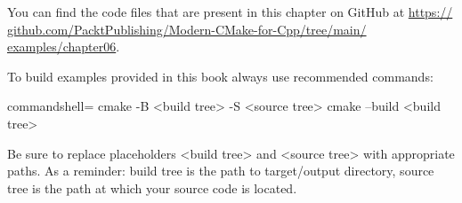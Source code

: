 You can find the code files that are present in this chapter on GitHub at \url{https:// github.com/PacktPublishing/Modern-CMake-for-Cpp/tree/main/ examples/chapter06}.

To build examples provided in this book always use recommended commands:

\begin{tcblisting}{commandshell={}}
cmake -B <build tree> -S <source tree>
cmake --build <build tree>
\end{tcblisting}

Be sure to replace placeholders <build tree> and <source tree> with appropriate paths. As a reminder: build tree is the path to target/output directory, source tree is the path at which your source code is located.